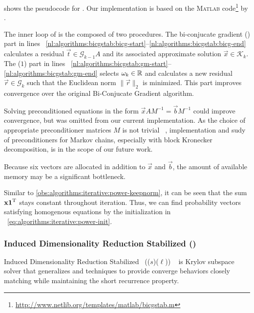  shows the pseudocode for
. Our implementation is based on the \textsc{Matlab}
code\footnote{\url{http://www.netlib.org/templates/matlab/bicgstab.m}}
by \citet{barrett1994templates}.

The inner loop of  is the composed of two
procedures. The bi-conjucate gradient () part in lines~%
\ref{nl:algorithms:bicgstab:bicg-start}--\ref{nl:algorithms:bicgstab:bicg-end}
calculates a residual $\vec{t} \in \mathcal{G}_{k - 1} A$ and its
associated approximate solution $\vec{x} \in \mathcal{K}_k$. The
($1$) part in lines~%
\ref{nl:algorithms:bicgstab:gm-start}--\ref{nl:algorithms:bicgstab:gm-end}
selects $\omega_k \in \mathbb{R}$ and calculates a new residual
$\vec{r} \in \mathcal{G}_{k}$ such that the Euclidean norm
$\| \vec{r} \|_2$ is minimized. This part improves convergence over
the original Bi-Conjucate Gradient algorithm.

Solving preconditioned equations in the form
$\vec{x} A M^{-1} = \vec{b} M^{-1}$ could improve convergence, but was
omitted from our current implementation. As the choice of appropriate
preconditioner matrices $M$ is not trivial%
~\citep{DBLP:journals/informs/LangvilleS04}, implementation and sudy
of preconditioners for Markov chains, especially with block Kronecker
decomposition, is in the scope of our future work.

Because six vectors are allocated in addition to $\vec{x}$ and
$\vec{b}$, the amount of available memory may be a significant
bottleneck.

Similar to \vref{obs:algorithms:iterative:power-keepnorm}, it can be
seen that the sum $\bm{\mathrm{x}} \bm{\mathrm{1}}^{\mathrm{T}}$ stays constant throughout
 iteration. Thus, we can find probability vectors
satisfying homogenous equations by the initialization in%
~\vref{eq:algorithms:iterative:power-init}.

\subsubsection{Induced Dimensionality Reduction Stabilized ()}
\label{ssec:algorithms:idrstab}

Induced Dimensionality Reduction Stabilized%
~(($s$)($\ell$))%
~\citep{sleijpen2010exploiting} is Krylov subspace solver that
generalizes  and  techniques to provide
converge behaviors closely matching  while maintaining
the short recurrence property.

